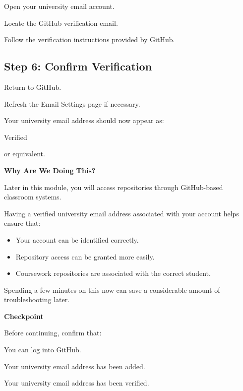 \documentclass{csc2059practical}
\begin{document}
Open your university email account.

Locate the GitHub verification email.

Follow the verification instructions provided by GitHub.

\subsection{Step 6: Confirm Verification}
Return to GitHub.

Refresh the Email Settings page if necessary.

Your university email address should now appear as:

Verified

or equivalent.
\begin{importantnote}
  
  \textbf{Why Are We Doing This?}\par
  \medskip
  Later in this module, you will access repositories through GitHub-based classroom systems.
  
  Having a verified university email address associated with your account helps ensure that:
  
  \begin{itemize}
    \item Your account can be identified correctly.
    \item Repository access can be granted more easily.
    \item Coursework repositories are associated with the correct student.
  \end{itemize}
  Spending a few minutes on this now can save a considerable amount of troubleshooting later.
\end{importantnote}
  
\begin{reflectionbox}
\textbf{Checkpoint}\par
\medskip

Before continuing, confirm that:


You can log into GitHub.


Your university email address has been added.


Your university email address has been verified.


\end{reflectionbox}
\end{document}
